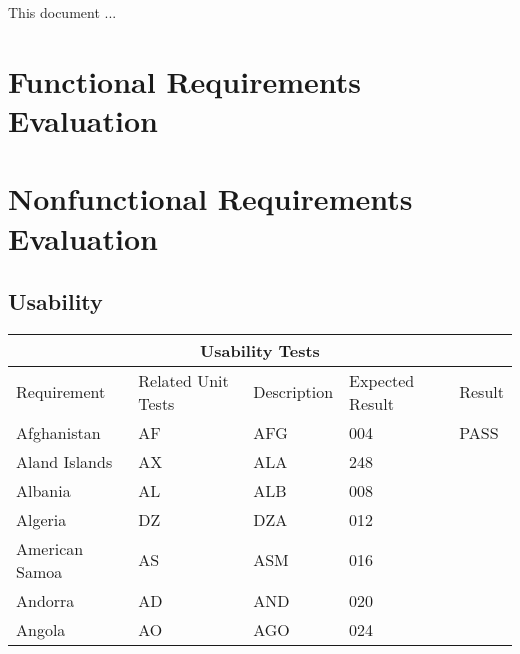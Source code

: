 \documentclass[12pt, titlepage]{article}
\begin{document}
\newpage

\tableofcontents

\listoftables %

\listoffigures %

\newpage


This document ...

\section{Functional Requirements Evaluation}

\section{Nonfunctional Requirements Evaluation}

\subsection{Usability}
\begin{tabular}{ |p{3cm}||p{3cm}|p{3cm}|p{3cm}|p{2cm}| }
  \hline
  \multicolumn{5}{|c|}{Usability Tests} \\
  \hline
  Requirement & Related Unit Tests & Description & Expected Result & Result\\
  \hline
  Afghanistan   & AF    &AFG&   004 & PASS\\
  Aland Islands&   AX  & ALA   &248 &\\
  Albania &AL & ALB&  008 &\\
  Algeria    &DZ & DZA&  012 &\\
  American Samoa&   AS  & ASM&016 &\\
  Andorra& AD  & AND   &020 &\\
  Angola& AO  & AGO&024 &\\
  \hline
 \end{tabular}
		
\end{document}
